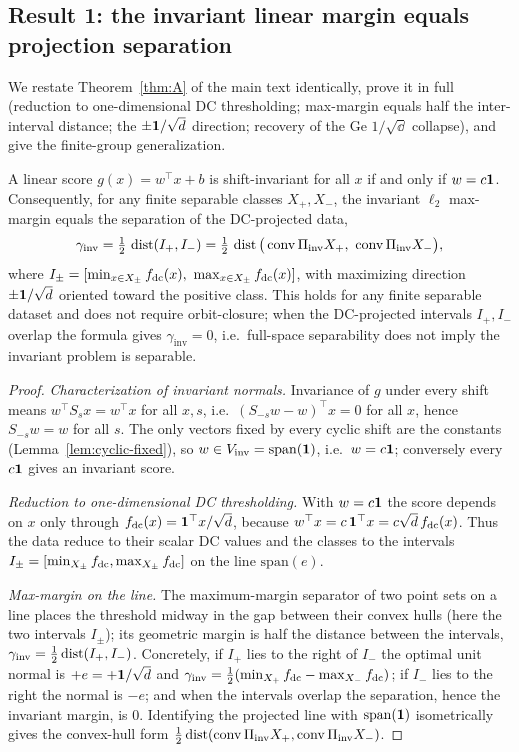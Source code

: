 \subsection{Result 1: the invariant linear margin equals projection separation}
\label{app:ft-margin}
We restate Theorem~\ref{thm:A} of the main text identically, prove it in full
(reduction to one-dimensional DC thresholding; max-margin equals half the
inter-interval distance; the $\pm\mathbf 1/\sqrt{d}$ direction; recovery of the Ge
$1/\sqrt\dd$ collapse), and give the finite-group generalization.

\begin{theorem}
\label{thm:A}
A linear score $g(x)=w^\top x+b$ is shift-invariant for all $x$ if and only if
$w=c\mathbf 1$. Consequently, for any finite separable classes $X_+,X_-$, the
invariant $\ell_2$ max-margin equals the separation of the DC-projected data,
\[
\gamma_{\mathrm{inv}}=\tfrac12\,\operatorname{dist}(I_+,I_-)
=\tfrac12\,\operatorname{dist}\big(\operatorname{conv}\Pi_{\mathrm{inv}} X_+,\ \operatorname{conv}\Pi_{\mathrm{inv}} X_-\big),
\]
where $I_\pm=[\min_{x\in X_\pm}\fdc(x),\ \max_{x\in X_\pm}\fdc(x)]$, with
maximizing direction $\pm\mathbf 1/\sqrt{d}$ oriented toward the positive class. This
holds for any finite separable dataset and does not require orbit-closure; when the
DC-projected intervals $I_+,I_-$ overlap the formula gives $\gamma_{\mathrm{inv}}=0$,
i.e.\ full-space separability does not imply the invariant problem is separable.
\end{theorem}
\begin{proof}
\emph{Characterization of invariant normals.} Invariance of $g$ under every
shift means $w^\top S_sx=w^\top x$ for all $x,s$, i.e.\ $(S_{-s}w-w)^\top x=0$
for all $x$, hence $S_{-s}w=w$ for all $s$. The only vectors fixed by every
cyclic shift are the constants (Lemma~\ref{lem:cyclic-fixed}), so
$w\in V_{\mathrm{inv}}=\mathrm{span}(\mathbf 1)$, i.e.\ $w=c\mathbf 1$; conversely every $c\mathbf 1$ gives
an invariant score.

\emph{Reduction to one-dimensional DC thresholding.} With $w=c\mathbf 1$ the score
depends on $x$ only through $f_{\mathrm{dc}}(x)=\mathbf 1^\top x/\sqrt{d}$, because
$w^\top x=c\,\mathbf 1^\top x=c\sqrt{d}\,f_{\mathrm{dc}}(x)$. Thus the data reduce to their
scalar DC values and the classes to the intervals
$I_\pm=[\min_{X_\pm}f_{\mathrm{dc}},\max_{X_\pm}f_{\mathrm{dc}}]$ on the line $\mathrm{span}(e)$.

\emph{Max-margin on the line.} The maximum-margin separator of two point sets on
a line places the threshold midway in the gap between their convex hulls (here
the two intervals $I_\pm$); its geometric margin is half the distance between
the intervals, $\gamma_{\mathrm{inv}}=\tfrac12\operatorname{dist}(I_+,I_-)$. Concretely, if
$I_+$ lies to the right of $I_-$ the optimal unit normal is $+e=+\mathbf 1/\sqrt{d}$
and $\gamma_{\mathrm{inv}}=\tfrac12(\min_{X_+}f_{\mathrm{dc}}-\max_{X_-}f_{\mathrm{dc}})$; if $I_-$
lies to the right the normal is $-e$; and when the intervals overlap the
separation, hence the invariant margin, is $0$. Identifying the projected line
with $\mathrm{span}(\mathbf 1)$ isometrically gives the convex-hull form
$\tfrac12\operatorname{dist}(\operatorname{conv}\Pi_{\mathrm{inv}} X_+,\operatorname{conv}\Pi_{\mathrm{inv}} X_-)$.
\end{proof}


